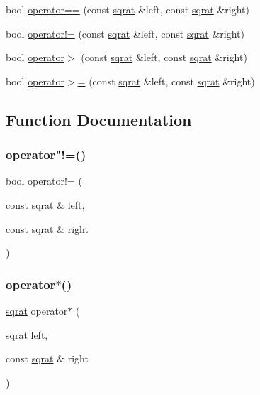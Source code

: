 \begin{DoxyCompactItemize}
bool \mbox{\hyperlink{adat-devel_2lib_2SU3_2sqrat_8cc_a4bacc3bfcb2f8d1841db3f2244581a08}{operator==}} (const \mbox{\hyperlink{classsqrat}{sqrat}} \&left, const \mbox{\hyperlink{classsqrat}{sqrat}} \&right)
\item 
bool \mbox{\hyperlink{adat-devel_2lib_2SU3_2sqrat_8cc_a32ca520cdf6f49ce0ba9b643d7b4372d}{operator!=}} (const \mbox{\hyperlink{classsqrat}{sqrat}} \&left, const \mbox{\hyperlink{classsqrat}{sqrat}} \&right)
\item 
bool \mbox{\hyperlink{adat-devel_2lib_2SU3_2sqrat_8cc_a9b45dd298a66c3afc8c1d7bd34225771}{operator$>$}} (const \mbox{\hyperlink{classsqrat}{sqrat}} \&left, const \mbox{\hyperlink{classsqrat}{sqrat}} \&right)
\item 
bool \mbox{\hyperlink{adat-devel_2lib_2SU3_2sqrat_8cc_ac19a9f2479674bf8ef795d1d5d176457}{operator$>$=}} (const \mbox{\hyperlink{classsqrat}{sqrat}} \&left, const \mbox{\hyperlink{classsqrat}{sqrat}} \&right)
\end{DoxyCompactItemize}


\subsection{Function Documentation}
\mbox{\label{adat-devel_2lib_2SU3_2sqrat_8cc_a32ca520cdf6f49ce0ba9b643d7b4372d}} 
\subsubsection{\texorpdfstring{operator"!=()}{operator!=()}}
{\footnotesize\ttfamily bool operator!= (\begin{DoxyParamCaption}\item[{const \mbox{\hyperlink{classsqrat}{sqrat}} \&}]{left,  }\item[{const \mbox{\hyperlink{classsqrat}{sqrat}} \&}]{right }\end{DoxyParamCaption})}

\mbox{\label{adat-devel_2lib_2SU3_2sqrat_8cc_a5e48469d1ed26b50b4126de2e0af54ce}} 
\subsubsection{\texorpdfstring{operator$\ast$()}{operator*()}}
{\footnotesize\ttfamily \mbox{\hyperlink{classsqrat}{sqrat}} operator$\ast$ (\begin{DoxyParamCaption}\item[{\mbox{\hyperlink{classsqrat}{sqrat}}}]{left,  }\item[{const \mbox{\hyperlink{classsqrat}{sqrat}} \&}]{right }\end{DoxyParamCaption})}

